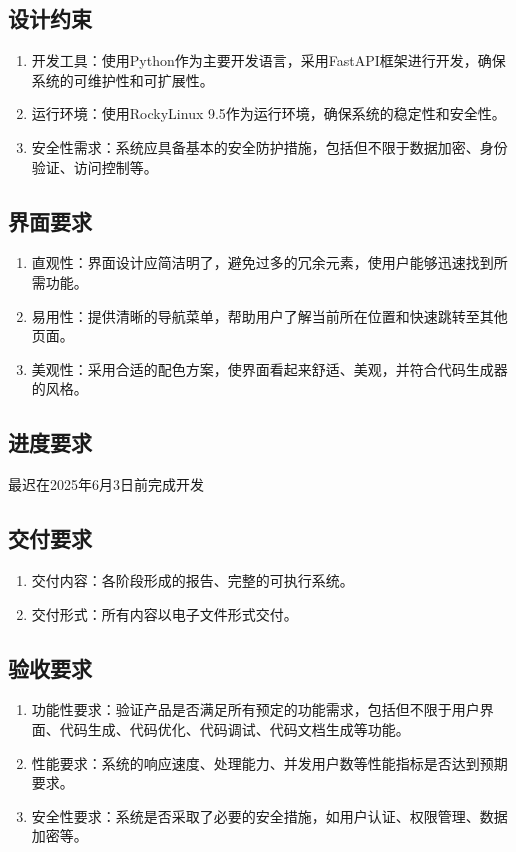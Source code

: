 \documentclass[
    report,     %
    oneside,    %
    UTF8,       %
    zihao=-4    %
]{config} %
\begin{document}
\subsection{设计约束}

\begin{enumerate}[label=(\arabic*)]
    \item 开发工具：使用Python作为主要开发语言，采用FastAPI框架进行开发，确保系统的可维护性和可扩展性。
    \item 运行环境：使用RockyLinux 9.5作为运行环境，确保系统的稳定性和安全性。
    \item 安全性需求：系统应具备基本的安全防护措施，包括但不限于数据加密、身份验证、访问控制等。
\end{enumerate}
\subsection{界面要求}
\begin{enumerate}[label=(\arabic*)]
    \item 直观性：界面设计应简洁明了，避免过多的冗余元素，使用户能够迅速找到所需功能。
    \item 易用性：提供清晰的导航菜单，帮助用户了解当前所在位置和快速跳转至其他页面。
    \item 美观性：采用合适的配色方案，使界面看起来舒适、美观，并符合代码生成器的风格。
\end{enumerate}
\subsection{进度要求}
最迟在2025年6月3日前完成开发
\subsection{交付要求}
\begin{enumerate}[label=(\arabic*)]
    \item 交付内容：各阶段形成的报告、完整的可执行系统。
    \item 交付形式：所有内容以电子文件形式交付。
\end{enumerate}
\subsection{验收要求}
\begin{enumerate}[label=(\arabic*)]
    \item 功能性要求：验证产品是否满足所有预定的功能需求，包括但不限于用户界面、代码生成、代码优化、代码调试、代码文档生成等功能。
    \item 性能要求：系统的响应速度、处理能力、并发用户数等性能指标是否达到预期要求。
    \item 安全性要求：系统是否采取了必要的安全措施，如用户认证、权限管理、数据加密等。
\end{enumerate}
\end{document}
